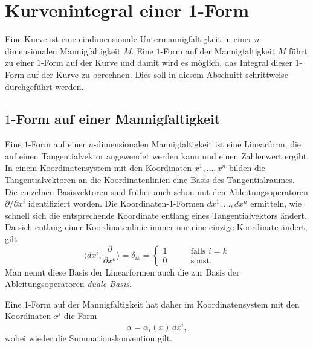 %
%
\section{Kurvenintegral einer 1-Form}
Eine Kurve ist eine eindimensionale Untermannigfaltigkeit in
einer $n$-dimensionalen Mannigfaltigkeit $M$.
Eine $1$-Form auf der Mannigfaltigkeit $M$ führt zu einer 
$1$-Form auf der Kurve und damit wird es möglich, das Integral
dieser 1-Form auf der Kurve zu berechnen.
Dies soll in diesem Abschnitt schrittweise durchgeführt werden.

\subsection{$1$-Form auf einer Mannigfaltigkeit}
Eine $1$-Form auf einer $n$-dimensionalen Mannigfaltigkeit ist eine
Linearform, die auf einen Tangentialvektor angewendet werden kann
und einen Zahlenwert ergibt.
In einem Koordinatensystem mit den Koordinaten $x^1,\dots,x^n$ bilden
die Tangentialvektoren an die Koordinatenlinien eine Basis des
Tangentialraumes.
Die einzelnen Basisvektoren sind früher auch schon mit den
Ableitungsoperatoren $\partial/\partial x^i$ identifiziert worden.
Die Koordinaten-1-Formen $dx^1,\dots,dx^n$ ermitteln, wie schnell sich
die entsprechende Koordinate entlang eines Tangentialvektors ändert.
Da sich entlang einer Koordinatenlinie immer nur eine einzige
Koordinate ändert, gilt
\[
\biggl\langle dx^i,\frac{\partial}{\partial x^k}\biggr\rangle
=
\delta_{ik}
=
\begin{cases}
1&\qquad \text{falls $i=k$}\\
0&\qquad \text{sonst}.
\end{cases}
\]
Man nennt diese Basis der Linearformen auch die zur Basis der
Ableitungsoperatoren {\em duale Basis}.

Eine $1$-Form auf der Mannigfaltigkeit hat daher im Koordinatensystem
mit den Koordinaten $x^i$ die Form
\[
\alpha
=
\alpha_i(x)\, dx^i,
\]
wobei wieder die Summationskonvention gilt.


